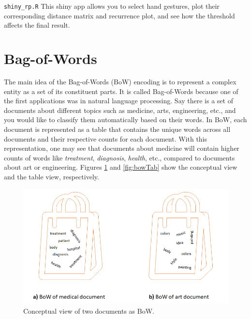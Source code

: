 \documentclass[
  11pt,
]{krantz}
\makeatletter
\newenvironment{kframe}{%
\medskip{}
\setlength{\fboxsep}{.8em}
 \def\at@end@of@kframe{}%
 \ifinner\ifhmode%
  \def\at@end@of@kframe{\end{minipage}}%
  \begin{minipage}{\columnwidth}%
 \fi\fi%
 \def\FrameCommand##1{\hskip\@totalleftmargin \hskip-\fboxsep
 \colorbox{shadecolor}{##1}\hskip-\fboxsep
     \hskip-\linewidth \hskip-\@totalleftmargin \hskip\columnwidth}%
 \MakeFramed {\advance\hsize-\width
   \@totalleftmargin\z@ \linewidth\hsize
   \@setminipage}}%
 {\par\unskip\endMakeFramed%
 \at@end@of@kframe}
\newenvironment{rmdblock}[1]
  {
  \begin{itemize}
  \renewcommand{\labelitemi}{
    \raisebox{-.7\height}[0pt][0pt]{
      {\setkeys{Gin}{width=3em,keepaspectratio}\texttt{[image: images/icons/\#1]}}
    }
  }
  \setlength{\fboxsep}{1em}
  \begin{kframe}
  \item
  }
  {
  \end{kframe}
  \end{itemize}
  }
\newenvironment{rmdshiny}
  {\begin{rmdblock}{touch}}
  {\end{rmdblock}}
\makeatother
\begin{document}
\begin{rmdshiny}
\texttt{shiny\_rp.R} This shiny app allows you to select hand gestures, plot their corresponding distance matrix and recurrence plot, and see how the threshold affects the final result.
\end{rmdshiny}

\hypertarget{bag-of-words}{%
\section{Bag-of-Words}\label{bag-of-words}}

The main idea of the Bag-of-Words (BoW) encoding is to represent a complex entity as a set of its constituent parts. It is called Bag-of-Words because one of the first applications was in natural language processing. Say there is a set of documents about different topics such as medicine, arts, engineering, etc., and you would like to classify them automatically based on their words. In BoW, each document is represented as a table that contains the unique words across all documents and their respective counts for each document. With this representation, one may see that documents about medicine will contain higher counts of words like \emph{treatment}, \emph{diagnosis}, \emph{health}, etc., compared to documents about art or engineering. Figures \ref{fig:bowExample} and \ref{fig:bowTab} show the conceptual view and the table view, respectively.

\begin{figure}

{\centering \includegraphics[width=0.7\linewidth]{images/bow} 

}

\caption{Conceptual view of two documents as BoW.}\label{fig:bowExample}
\end{figure}
\end{document}
